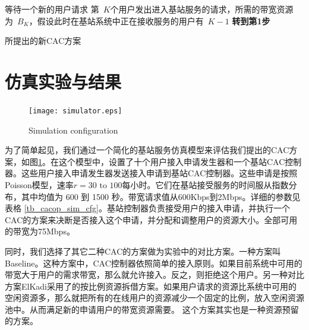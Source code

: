 \begin{algorithm}[bt]
等待一个新的用户请求\;
第~$K$个用户发出进入基站服务的请求，所需的带宽资源为~$B_K$，假设此时在基站系统中正在接收服务的用户有~$K-1$\;
{\bf{转到第1步}}\;
\caption{所提出的新CAC方案}
\label{agr_cac}
\end{algorithm}

\section{仿真实验与结果}
\label{cacop_sim}
%
\begin{figure}[tb]
\centering
\texttt{[image: simulator.eps]}
\caption{Simulation configuration} \label{pic_cacop_sim_cfg}
\end{figure}

为了简单起见，我们通过一个简化的基站服务仿真模型来评估我们提出的CAC方案，如图\ref{pic_cacop_sim_cfg}。在这个模型中，设置了十个用户接入申请发生器和一个基站CAC控制器。这些用户接入申请发生器发送接入申请到基站CAC控制器。这些申请是按照Poisson模型，速率$r=30 \text{ to } 100 $每小时。它们在基站接受服务的时间服从指数分布，其中均值为 600 到 1500 秒。带宽请求值从600Kbps到2Mbps。详细的参数见表格 \ref{tb_cacop_sim_cfg}。基站控制器负责接受用户的接入申请，并执行一个CAC的方案来决断是否接入这个申请，并分配和调整用户的资源大小。全部可用的带宽为75Mbps。

同时，我们选择了其它二种CAC的方案做为实验中的对比方案。一种方案叫Baseline。这种方案中，CAC控制器依照简单的接入原则。如果目前系统中可用的带宽大于用户的需求带宽，那么就允许接入。反之，则拒绝这个用户。另一种对比方案ElKadi采用了的按比例资源拆借方案。如果用户请求的资源比系统中可用的空闲资源多，那么就把所有的在线用户的资源减少一个固定的比例，放入空闲资源池中。从而满足新的申请用户的带宽资源需要。\cite{EL-Kadi2002} 这个方案其实也是一种资源预留的方案。

